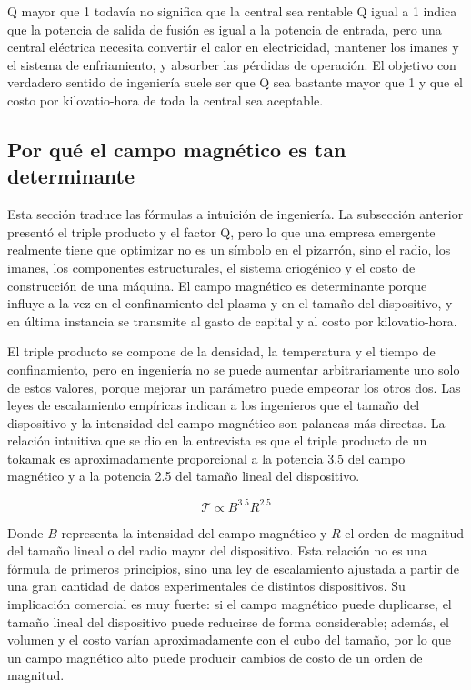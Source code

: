 \documentclass[a4paper]{article}
\begin{document}
\begin{importantbox}{Q mayor que 1 todavía no significa que la central sea rentable}
Q igual a 1 indica que la potencia de salida de fusión es igual a la potencia de entrada, pero una central eléctrica necesita convertir el calor en electricidad, mantener los imanes y el sistema de enfriamiento, y absorber las pérdidas de operación. El objetivo con verdadero sentido de ingeniería suele ser que Q sea bastante mayor que 1 y que el costo por kilovatio-hora de toda la central sea aceptable.
\end{importantbox}

\subsection{Por qué el campo magnético es tan determinante}

Esta sección traduce las fórmulas a intuición de ingeniería. La subsección anterior presentó el triple producto y el factor Q, pero lo que una empresa emergente realmente tiene que optimizar no es un símbolo en el pizarrón, sino el radio, los imanes, los componentes estructurales, el sistema criogénico y el costo de construcción de una máquina. El campo magnético es determinante porque influye a la vez en el confinamiento del plasma y en el tamaño del dispositivo, y en última instancia se transmite al gasto de capital y al costo por kilovatio-hora.

El triple producto se compone de la densidad, la temperatura y el tiempo de confinamiento, pero en ingeniería no se puede aumentar arbitrariamente uno solo de estos valores, porque mejorar un parámetro puede empeorar los otros dos. Las leyes de escalamiento empíricas indican a los ingenieros que el tamaño del dispositivo y la intensidad del campo magnético son palancas más directas. La relación intuitiva que se dio en la entrevista es que el triple producto de un tokamak es aproximadamente proporcional a la potencia 3.5 del campo magnético y a la potencia 2.5 del tamaño lineal del dispositivo.

\[
\mathcal{T}\propto B^{3.5}R^{2.5}
\]

Donde $B$ representa la intensidad del campo magnético y $R$ el orden de magnitud del tamaño lineal o del radio mayor del dispositivo. Esta relación no es una fórmula de primeros principios, sino una ley de escalamiento ajustada a partir de una gran cantidad de datos experimentales de distintos dispositivos. Su implicación comercial es muy fuerte: si el campo magnético puede duplicarse, el tamaño lineal del dispositivo puede reducirse de forma considerable; además, el volumen y el costo varían aproximadamente con el cubo del tamaño, por lo que un campo magnético alto puede producir cambios de costo de un orden de magnitud.
\end{document}
